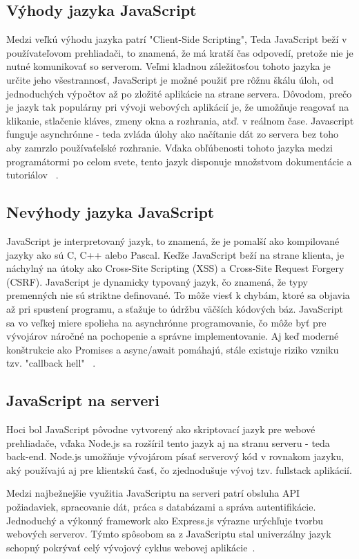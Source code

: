 \subsection{Výhody jazyka JavaScript}
Medzi veľkú výhodu jazyka patrí "Client-Side Scripting", Teda JavaScript beží v používateľovom prehliadači, to znamená, že má kratší čas 
odpovedí, pretože nie je nutné komunikovať so serverom. Veľmi kladnou záležitosťou tohoto jazyka je určite jeho všestrannosť,
JavaScript je možné použiť pre rôžnu škálu úloh, od jednoduchých výpočtov až po zložité aplikácie na strane servera. Dôvodom, prečo je jazyk tak 
populárny pri vývoji webových aplikácií je, že umožňuje reagovať na klikanie, stlačenie kláves, zmeny okna a rozhrania, atď. v reálnom čase.
Javascript funguje asynchrónne - teda zvláda úlohy ako načítanie dát zo servera bez toho aby zamrzlo používaťeľské rozhranie. Vďaka 
obľúbenosti tohoto jazyka medzi  programátormi po celom svete, tento jazyk disponuje množstvom dokumentácie a tutoriálov ~\cite{gfg_intro_js}.

\subsection{Nevýhody jazyka JavaScript}
JavaScript je interpretovaný jazyk, to znamená, že je pomalší ako kompilované jazyky ako sú C, C++ alebo Pascal. 
Keďže JavaScript beží na strane klienta, je náchylný na útoky ako Cross-Site Scripting (XSS) a Cross-Site Request Forgery (CSRF).
JavaScript je dynamicky typovaný jazyk, čo znamená, že typy premenných nie sú striktne definované. To môže viesť k chybám, ktoré sa 
objavia až pri spustení programu, a sťažuje to údržbu väčších kódových báz. JavaScript sa vo veľkej miere spolieha na asynchrónne programovanie, 
čo môže byť pre vývojárov náročné na pochopenie a správne implementovanie. Aj keď moderné konštrukcie ako Promises a async/await pomáhajú, 
stále existuje riziko vzniku tzv. "callback hell" ~\cite{itpedia_js_downsides}.

\subsection{JavaScript na serveri}
Hoci bol JavaScript pôvodne vytvorený ako skriptovací jazyk pre webové prehliadače, vďaka Node.js sa rozšíril tento jazyk aj na stranu 
serveru - teda back-end. Node.js umožňuje vývojárom písať serverový kód v rovnakom jazyku, aký používajú aj pre klientskú časť, čo 
zjednodušuje vývoj tzv. fullstack aplikácií.

Medzi najbežnejšie využitia JavaScriptu na serveri patrí obsluha API požiadaviek, spracovanie dát, práca s databázami a správa autentifikácie. 
Jednoduchý a výkonný framework ako Express.js výrazne urýchľuje tvorbu webových serverov. Týmto spôsobom sa z JavaScriptu stal univerzálny 
jazyk schopný pokrývať celý vývojový cyklus webovej aplikácie~\cite{nodejs_gfg}.


